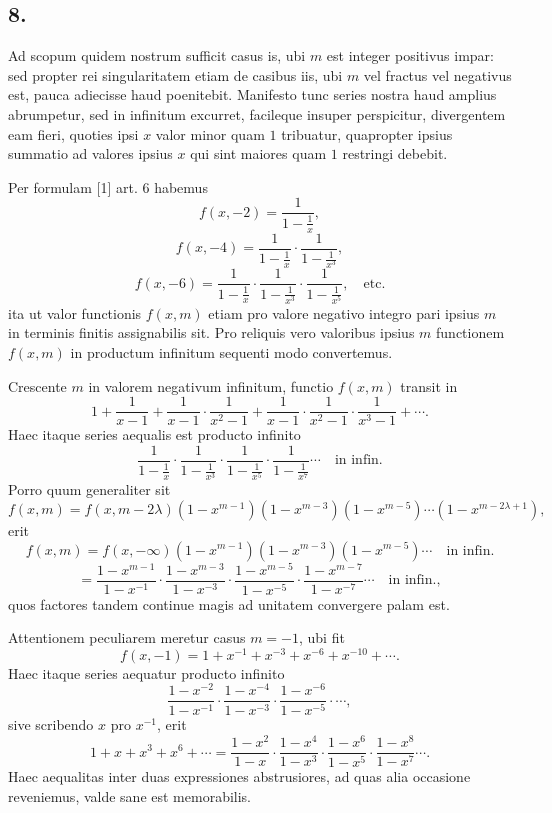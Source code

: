 \documentclass[12pt]{article}
\begin{document}
\subsection*{8.}

Ad scopum quidem nostrum sufficit casus is, ubi $m$ est integer positivus impar: sed propter rei singularitatem etiam de casibus iis, ubi $m$ vel fractus vel negativus est, pauca adiecisse haud poenitebit. Manifesto tunc series nostra haud amplius abrumpetur, sed in infinitum excurret, facileque insuper perspicitur, divergentem eam fieri, quoties ipsi $x$ valor minor quam $1$ tribuatur, quapropter ipsius summatio ad valores ipsius $x$ qui sint maiores quam $1$ restringi debebit.

Per formulam [1] art. 6 habemus
\[
f(x,-2)=\frac{1}{1-\frac1x},
\]
\[
f(x,-4)=\frac{1}{1-\frac1x}\cdot\frac{1}{1-\frac1{x^3}},
\]
\[
f(x,-6)=\frac{1}{1-\frac1x}\cdot\frac{1}{1-\frac1{x^3}}\cdot\frac{1}{1-\frac1{x^5}},\quad\text{etc.}
\]
ita ut valor functionis $f(x,m)$ etiam pro valore negativo integro pari ipsius $m$ in terminis finitis assignabilis sit. Pro reliquis vero valoribus ipsius $m$ functionem $f(x,m)$ in productum infinitum sequenti modo convertemus.

Crescente $m$ in valorem negativum infinitum, functio $f(x,m)$ transit in
\[
1+\frac{1}{x-1}
+\frac{1}{x-1}\cdot\frac{1}{x^2-1}
+\frac{1}{x-1}\cdot\frac{1}{x^2-1}\cdot\frac{1}{x^3-1}
+\cdots.
\]
Haec itaque series aequalis est producto infinito
\[
\frac{1}{1-\frac1x}\cdot\frac{1}{1-\frac1{x^3}}\cdot
\frac{1}{1-\frac1{x^5}}\cdot\frac{1}{1-\frac1{x^7}}\cdots\quad\text{in infin.}
\]
Porro quum generaliter sit
\[
f(x,m)=f(x,m-2\lambda)(1-x^{m-1})(1-x^{m-3})(1-x^{m-5})\cdots(1-x^{m-2\lambda+1}),
\]
erit
\[
f(x,m)=f(x,-\infty)(1-x^{m-1})(1-x^{m-3})(1-x^{m-5})\cdots\quad\text{in infin.}
\]
\[
=\frac{1-x^{m-1}}{1-x^{-1}}\cdot
\frac{1-x^{m-3}}{1-x^{-3}}\cdot
\frac{1-x^{m-5}}{1-x^{-5}}\cdot
\frac{1-x^{m-7}}{1-x^{-7}}\cdots\quad\text{in infin.},
\]
quos factores tandem continue magis ad unitatem convergere palam est.

Attentionem peculiarem meretur casus $m=-1$, ubi fit
\[
f(x,-1)=1+x^{-1}+x^{-3}+x^{-6}+x^{-10}+\cdots.
\]
Haec itaque series aequatur producto infinito
\[
\frac{1-x^{-2}}{1-x^{-1}}\cdot
\frac{1-x^{-4}}{1-x^{-3}}\cdot
\frac{1-x^{-6}}{1-x^{-5}}\cdot\cdots,
\]
sive scribendo $x$ pro $x^{-1}$, erit
\[
1+x+x^3+x^6+\cdots
=
\frac{1-x^2}{1-x}\cdot
\frac{1-x^4}{1-x^3}\cdot
\frac{1-x^6}{1-x^5}\cdot
\frac{1-x^8}{1-x^7}\cdots.
\]
Haec aequalitas inter duas expressiones abstrusiores, ad quas alia occasione reveniemus, valde sane est memorabilis.
\end{document}
